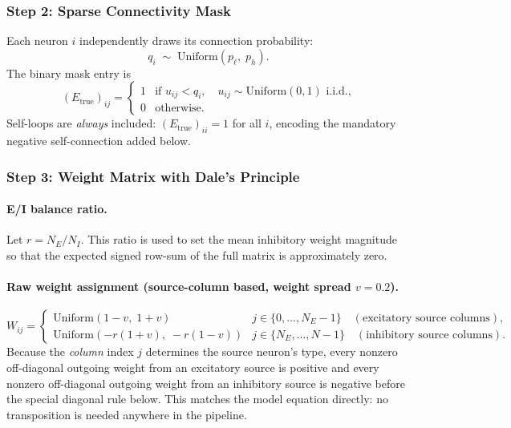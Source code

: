 \documentclass[11pt]{article}
\begin{document}
\subsubsection{Step 2: Sparse Connectivity Mask}
\label{sec:mask}

Each neuron $i$ independently draws its connection probability:
\begin{equation}
  q_i \;\sim\; \mathrm{Uniform}(p_\ell,\; p_h).
\end{equation}
The binary mask entry is
\begin{equation}
  (E_{\text{true}})_{ij} =
  \begin{cases}
    1 & \text{if } u_{ij} < q_i, \quad
        u_{ij} \sim \mathrm{Uniform}(0,1) \text{ i.i.d.,} \\
    0 & \text{otherwise.}
  \end{cases}
\end{equation}
Self-loops are \emph{always} included: $(E_{\text{true}})_{ii} = 1$
for all $i$, encoding the mandatory negative self-connection added below.

\subsubsection{Step 3: Weight Matrix with Dale's Principle}
\label{sec:weights}

\paragraph{E/I balance ratio.}
Let $r = N_E / N_I$.
This ratio is used to set the mean inhibitory weight magnitude so
that the expected signed row-sum of the full matrix is
approximately zero.

\paragraph{Raw weight assignment (source-column based, weight spread $v = 0.2$).}
\begin{equation}
  W_{ij} =
  \begin{cases}
    \mathrm{Uniform}(1-v,\; 1+v) &
      j \in \{0,\dots,N_E-1\} \quad (\text{excitatory source columns}), \\[4pt]
    \mathrm{Uniform}(-r(1+v),\; -r(1-v)) &
      j \in \{N_E,\dots,N-1\} \quad (\text{inhibitory source columns}).
  \end{cases}
  \label{eq:raw_weights}
\end{equation}
Because the \emph{column} index $j$ determines the source neuron's type,
every nonzero off-diagonal outgoing weight from an excitatory source is
positive and every nonzero off-diagonal outgoing weight from an inhibitory
source is negative before the special diagonal rule below. This matches the
model equation directly: no transposition is needed anywhere in the
pipeline.
\end{document}
